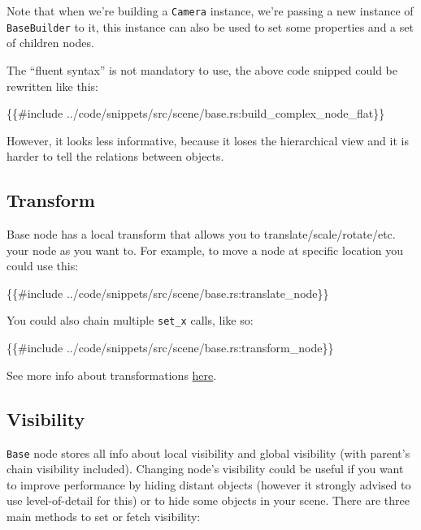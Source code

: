 \documentclass[
]{book}
\newenvironment{Shaded}{\begin{snugshade}}{\end{snugshade}}
\newcommand{\NormalTok}[1]{#1}
\theoremstyle{definition}
\theoremstyle{definition}
\theoremstyle{definition}
\theoremstyle{definition}
\theoremstyle{remark}
\begin{document}
Note that when we're building a \texttt{Camera} instance, we're passing a new instance of \texttt{BaseBuilder} to it, this instance can also be used to set some properties and a set of children nodes.

The ``fluent syntax'' is not mandatory to use, the above code snipped could be rewritten like this:

\begin{Shaded}
\begin{Highlighting}[]
\NormalTok{\{\{\#include ../code/snippets/src/scene/base.rs:build\_complex\_node\_flat\}\}}
\end{Highlighting}
\end{Shaded}

However, it looks less informative, because it loses the hierarchical view and it is harder to tell the relations between objects.

\subsection{Transform}\label{transform}

Base node has a local transform that allows you to translate/scale/rotate/etc. your node as you want to. For example, to move a node at specific location you could use this:

\begin{Shaded}
\begin{Highlighting}[]
\NormalTok{\{\{\#include ../code/snippets/src/scene/base.rs:translate\_node\}\}}
\end{Highlighting}
\end{Shaded}

You could also chain multiple \texttt{set\_x} calls, like so:

\begin{Shaded}
\begin{Highlighting}[]
\NormalTok{\{\{\#include ../code/snippets/src/scene/base.rs:transform\_node\}\}}
\end{Highlighting}
\end{Shaded}

See more info about transformations \href{./transform.md}{here}.

\subsection{Visibility}\label{visibility}

\texttt{Base} node stores all info about local visibility and global visibility (with parent's chain visibility included). Changing node's visibility could be useful if you want to improve performance by hiding distant objects (however it strongly advised to use level-of-detail for this) or to hide some objects in your scene. There are three main methods to set or fetch visibility:
\end{document}
